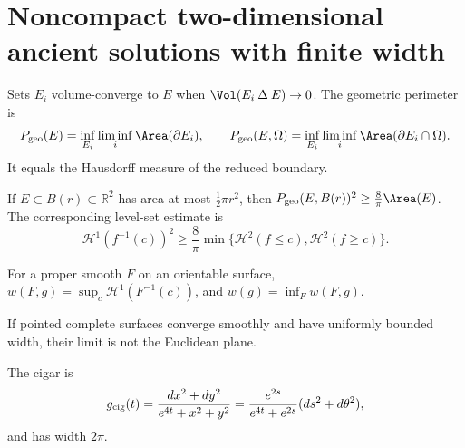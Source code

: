 \section{Noncompact two-dimensional ancient solutions with finite width}

\begin{definition}
\label{def:chow-iv-volume-perimeter}
Sets \(E_i\) volume-converge to \(E\) when \(\Vol(E_i\mathbin\Delta E)\to0\).
The geometric perimeter is
\[
 P_{\rm geo}(E)=\inf_{E_i}\liminf_i\Area(\partial E_i),\qquad
 P_{\rm geo}(E,\Omega)=\inf_{E_i}\liminf_i\Area(\partial E_i\cap\Omega).
\]
It equals the Hausdorff measure of the reduced boundary.
\end{definition}

\begin{theorem}
\label{thm:chow-iv-relative-isoperimetric}
If \(E\subset B(r)\subset\mathbb R^2\) has area at most \(\frac12\pi r^2\),
then \(P_{\rm geo}(E,B(r))^2\ge\frac8\pi\Area(E)\).  The corresponding
level-set estimate is
\[
 \mathcal H^1(f^{-1}(c))^2\ge\frac8\pi\min\{\mathcal H^2(f\le c),\mathcal H^2(f\ge c)\}.
\]
\end{theorem}

\begin{definition}[Width]
\label{def:chow-iv-width}
For a proper smooth \(F\) on an orientable surface,
\(w(F,g)=\sup_c\mathcal H^1(F^{-1}(c))\), and \(w(g)=\inf_F w(F,g)\).
\end{definition}

\begin{lemma}
\label{lem:chow-iv-width-not-euclidean}
If pointed complete surfaces converge smoothly and have uniformly bounded
width, their limit is not the Euclidean plane.
\end{lemma}

\begin{example}
\label{ex:chow-iv-cigar}
The cigar is
\[
 g_{\rm cig}(t)=\frac{dx^2+dy^2}{e^{4t}+x^2+y^2}
 =\frac{e^{2s}}{e^{4t}+e^{2s}}(ds^2+d\theta^2),
\]
and has width \(2\pi\).
\end{example}

